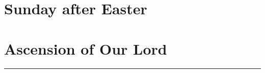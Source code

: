 {{
\section{ Sunday after Easter}
\label{easter5}
\printcommonvespers{}
\def\postchaptertitle{\label{easter5-chapter}}
\def\premagverses{\oldneedspace{12\baselineskip}}
\def\precollect{\printvrmanenobiscum}
\def\postmagtitle{\label{easter5-mag}}
\benedicamusdomino{}
}

{
\section{Ascension of Our Lord}
\label{ascension}
\subtitle{ Class}
\subtitle{I \& II Vespers}

\def\deusinadjutoriumsolemn{T}
\def\prepsalmthreeverses{}
\def\prevr{\needspace{12\baselineskip}}
\def\premagnificat{\oldneedspace{7\baselineskip}}
\def\begincollectcols{%
\begin{parcolumns}[rulebetween,colwidths={1=0.46\linewidth}]{2}}
\def\definevesperspropers{
}
\def\definevesperspropersalt{
}
\def\vesperspropersnote{At II Vespers:
\medskip}
\def\vesperspropersaltnote{At I Vespers:
\medskip}
\let\printhymnnote=\undefined
\def\hymnlabel{hymn-salutishumanaesator}
\def\prevr{\bigskip{}
\emph{On the Sunday after the Ascension, \emph{\Vbar{}~Dóminus in cælo}, p.~\pageref{vr-sundayafterascension}}.

\bigskip}

\def\commemorations{If today is 30 April or 1 May, \emph{First Vespers of St Joseph the Worker} is commemorated as on page \pageref{stjoseph-worker-commem}.}
\printcommemnote[1]{}
\bigskip
\hrule
}

{
}}
